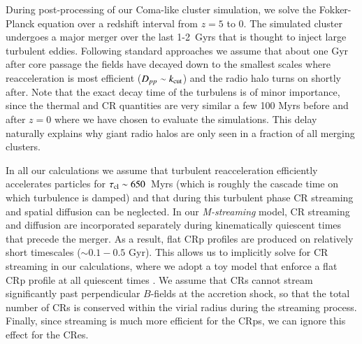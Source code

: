 \documentclass[fleqn,usenatbib,useAMS]{mnras}
\newcommand{\Mstream}{{\it M-streaming}\xspace}
\begin{document}
During post-processing of our Coma-like cluster simulation, we solve
the Fokker-Planck equation over a redshift interval from $z=5$ to
0. The simulated cluster undergoes a major merger over the last
1-2~Gyrs that is thought to inject large turbulent eddies. Following
standard approaches
\citep{brunetti07,brunetti11,2004ApJ...614..757Y,2015ApJ...800...60M}
we assume that about one Gyr after core passage the fields have
decayed down to the smallest scales where reacceleration is most
efficient ($D_{pp}\sim k_{\mathrm{cut}}$) and the radio halo turns on
shortly after. Note that the exact decay time of the turbulens is of
minor importance, since the thermal and CR quantities are very similar
a few 100 Myrs before and after $z=0$ where we have chosen to evaluate
the simulations. This delay naturally explains why giant radio halos
are only seen in a fraction of all merging clusters.

In all our calculations we assume that turbulent reacceleration
efficiently accelerates particles for $\tau_{\mathrm{cl}}\sim650$~Myrs
(which is roughly the cascade time on which turbulence is damped) and
that during this turbulent phase CR streaming and spatial diffusion
can be neglected. In our \Mstream model, CR streaming and diffusion
are incorporated separately during kinematically quiescent times that
precede the merger. As a result, flat CRp profiles are produced on
relatively short timescales ($\sim 0.1-0.5$ Gyr). This allows us to
implicitly solve for CR streaming in our calculations, where we adopt
a toy model that enforce a flat CRp profile at all quiescent times
\citep{wiener13}. We assume that CRs cannot stream significantly past
perpendicular $B$-fields at the accretion shock, so that the total
number of CRs is conserved within the virial radius during the
streaming process. Finally, since streaming is much more efficient for
the CRps, we can ignore this effect for the CRes.
\end{document}
